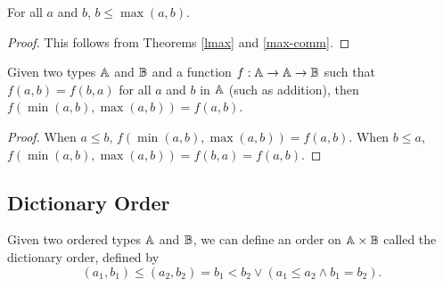 \documentclass[../math.tex]{subfiles}
\begin{document}
\begin{theorem} \label{rmax}
    For all $a$ and $b$, $b \leq \max(a, b)$.
\end{theorem}
\begin{proof}
    This follows from Theorems \ref{lmax} and \ref{max-comm}.
\end{proof}

\begin{theorem}
    Given two types $\mathbb{A}$ and $\mathbb{B}$ and a function $f : \mathbb{A} \rightarrow \mathbb{A}
    \rightarrow \mathbb{B}$ such that $f(a, b) = f(b, a)$ for all $a$ and $b$ in $\mathbb{A}$
    (such as addition), then $f(\min(a, b), \max(a, b)) = f(a, b)$.
\end{theorem}
\begin{proof}
    When $a \leq b$, $f(\min(a, b), \max(a, b)) = f(a, b)$.  When $b \leq a$,
    $f(\min(a, b), \max(a, b)) = f(b, a) = f(a, b)$.
\end{proof}

\subsection{Dictionary Order}

\begin{definition}
    Given two ordered types $\mathbb{A}$ and $\mathbb{B}$, we can define an order on $\mathbb{A} \times
    \mathbb{B}$ called the dictionary order, defined by
    \[
        (a_1, b_1) \leq (a_2, b_2) = b_1 < b_2 \vee (a_1 \leq a_2 \wedge b_1 =
        b_2).
    \]
\end{definition}
\end{document}
